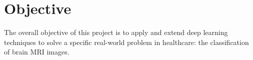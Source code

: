 \section{Objective}\label{s:objective}
The overall objective of this project is to apply and extend deep learning techniques to solve a specific real-world problem in healthcare: the classification of brain MRI images. 
